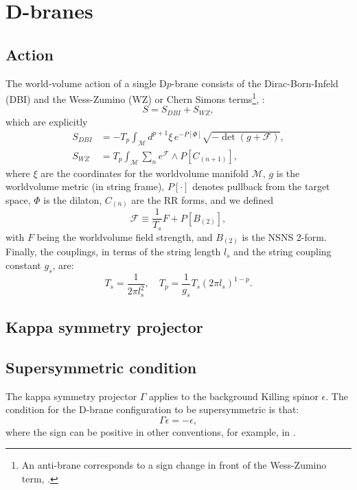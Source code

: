 \section{D-branes}

\subsection{Action}
The world-volume action of a single D$p$-brane consists of the Dirac-Born-Infeld (DBI) and the Wess-Zumino (WZ) or Chern Simons terms\footnote{An anti-brane corresponds to a sign change in front of the Wess-Zumino term, \cite{Kruczenski:2003be}.},
\cite{Ammon:2015wua}:
\begin{equation}
 S = S_{DBI} + S_{WZ},
\end{equation}
which are explicitly
\begin{align}
 S_{DBI} & = 
 -T_p \int_\mathcal{M} d^{p+1}\xi \, e^{-P[\Phi] } \sqrt{-\det (g+\mathcal{F})},\\
 S_{WZ} & =
 T_p\int _\mathcal{M} \sum_n e^{\mathcal{F}}\wedge P[C_{(n+1)}],
\end{align}
where $\xi$ are the coordinates for the worldvolume manifold $\mathcal{M}$, $g$ is the worldvolume metric (in string frame), $P[\cdot]$ denotes pullback from the target space, $\Phi$ is the dilaton, $C_{(n)}$ are the RR forms, and we defined
\begin{equation}
 \mathcal{F} \equiv \frac{1}{T_s} F + P[B_{(2)}], 
\end{equation}
with $F$ being the worldvolume field strength, and $B_{(2)}$ is the NSNS 2-form. Finally, the couplings, in terms of the string length $l_s$ and the string coupling constant $g_s$, are:
\begin{equation}
 T_{s} = \dfrac{1}{2\pi l_s^2}, \quad T_p = \dfrac{1}{g_s} T_s (2\pi l_s)^{1-p}.
\end{equation}


\subsection{Kappa symmetry projector}



\subsection{Supersymmetric condition}
The kappa symmetry projector $\Gamma$ applies to the background Killing spinor $\epsilon$. The condition for the D-brane configuration to be supersymmetric is that:
\begin{equation} \label{eq:susyCondition}
 \Gamma \epsilon = - \epsilon,
\end{equation}
where the sign can be positive in other conventions, for example, in \cite{Skenderis:2002vf}.
    


